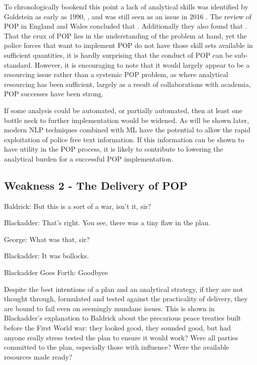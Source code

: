 To chronologically bookend this point a lack of analytical skills was identified by Goldstein as early as 1990, \parencite{goldstein1990}, and was still seen as an issue in 2016 \parencite{popchap11}. The review of POP in England and Wales \parencite{POPUCL} concluded that . Additionally they also found that . That the crux of POP lies in the understanding of the problem at hand, yet the police forces that want to implement POP do not have those skill sets available in sufficient quantities, it is hardly surprising that the conduct of POP can be sub-standard. However, it is encouraging to note that it would largely appear to be a resourcing issue rather than a systemic POP problem, as where analytical resourcing has been sufficient, largely as a result of collaborations with academia, POP successes have been strong.

If some analysis could be automated, or partially automated, then at least one bottle neck to further implementation would be widened. As will be shown later, modern NLP techniques combined with ML have the potential to allow the rapid exploitation of police free text information. If this information can be shown to have utility in the POP process, it is likely to contribute to lowering the analytical burden for a successful POP implementation.


\subsection{Weakness 2 - The Delivery of POP}


\epigraph{\centering Baldrick:  But this is a sort of a war, isn't it, sir?
 
Blackadder: That's right.  You see, there was a tiny flaw in the plan.
 
George:   What was that, sir?
 
Blackadder:  It was bollocks.}{Blackadder Goes Forth: Goodbyee }

Despite the best intentions of a plan and an analytical strategy, if they are not thought through, formulated and tested against the practicality of delivery, they are bound to fail even on seemingly mundane issues. This is shown in Blackadder’s explanation to Baldrick about the precarious peace treaties built before the First World war: they looked good, they sounded good, but had anyone really stress tested the plan to ensure it would work? Were all parties committed to the plan, especially those with influence? Were the available resources made ready?

